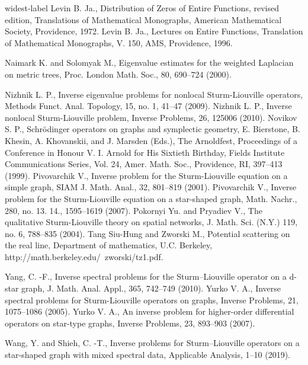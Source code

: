 \documentclass[10pt,a4paper]{article}
\theoremstyle{plain}
\theoremstyle{definition}
\theoremstyle{remark}
\numberwithin{equation}{section}
\begin{document}
\begin{thebibliography}{widest-label}
Levin B. Ja., Distribution of Zeros of Entire
Functions, revised edition, Translations of Mathematical
Monographs, American Mathematical Society, Providence, 1972.
Levin B. Ja., Lectures on Entire Functions,
Translation of Mathematical Monographs, V. 150, AMS, Providence, 1996.

Naimark K. and Solomyak M., Eigenvalue estimates for the weighted Laplacian on metric trees, Proc. London Math. Soc., 80, 690--724  (2000).


Nizhnik L. P., Inverse eigenvalue problems for nonlocal Sturm-Liouville operators, Methods Funct. Anal. Topology, 15, no. 1, 41--47 (2009).
Nizhnik L. P., Inverse nonlocal Sturm-Liouville problem, Inverse Problems,  26, 125006 (2010). 
Novikov S. P., Schr\"{o}dinger operators on graphs and symplectic geometry, E. Bierstone, B. Khesin, A. Khovanskii, and J. Marsden (Eds.), The Arnoldfest, Proceedings of a Conference in Honour V. I. Arnold for His Sixtieth Birthday, Fields Institute Communications Series, Vol. 24, Amer. Math. Soc., Providence, RI, 397--413 (1999).
Pivovarchik V., Inverse problem for the Sturm-Liouville equation on a simple graph, SIAM J. Math. Anal., 32, 801--819 (2001).
Pivovarchik V., Inverse problem for the Sturm-Liouville equation on a star-shaped graph, Math. Nachr.,  280, no. 13. 14., 1595--1619  (2007).
Pokornyi Yu. and Pryadiev  V., The qualitative Sturm-Liouville theory on spatial networks, J. Math. Sci. (N.Y.) 119, no. 6, 788--835 (2004).
Tang Siu-Hung and Zworski M., Potential scattering on the real line, Department of mathematics, U.C. Berkeley, http://math.berkeley.edu/~zworski/tz1.pdf.

Yang, C. -F., Inverse spectral problems for the Sturm--Liouville operator on a d-star graph, J. Math. Anal. Appl., 365, 742--749  (2010).
Yurko V. A., Inverse spectral problems for Sturm-Liouville operators on graphs, Inverse Problems, 21, 1075--1086 (2005).
Yurko V. A., An inverse problem for higher-order differential operators on star-type graphs, Inverse Problems, 23, 893--903 (2007).

Wang, Y. and Shieh, C. -T., Inverse problems for Sturm--Liouville operators on a star-shaped graph with mixed spectral data, Applicable Analysis, 1--10 (2019).




\end{thebibliography}
\end{document}

